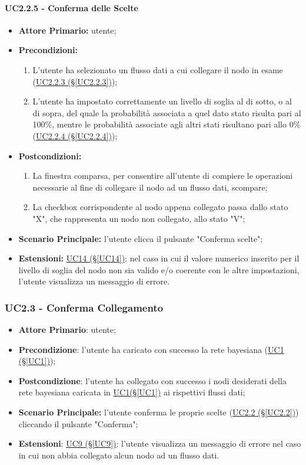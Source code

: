 \paragraph{UC2.2.5 - Conferma delle Scelte}\label{UC2.2.5}
\begin{itemize}
\item \textbf{Attore Primario:} utente;
\item \textbf{Precondizioni:}
	\begin{enumerate}
	\item L'utente ha selezionato un flusso dati a cui collegare il nodo in esame (\hyperref[UC2.2.3]{UC2.2.3 							(§\ref*{UC2.2.3})});
	\item L'utente ha impostato correttamente un livello di soglia al di sotto, o al di sopra, 	del quale la probabilità associata a quel dato stato risulta pari al 100\%, mentre le probabilità associate agli altri stati risultano pari allo 0\% (\hyperref[UC2.2.4]{UC2.2.4 (§\ref*{UC2.2.4})});
	\end{enumerate}
\item \textbf{Postcondizioni:}
	\begin{enumerate}
	\item La finestra comparsa, per consentire all'utente di compiere le operazioni necessarie al fine di collegare il 		nodo ad un flusso dati, scompare;
	\item La checkbox corrispondente al nodo appena collegato passa dallo stato "X", che rappresenta un nodo non 					collegato, allo stato "V";
	\end{enumerate}
\item \textbf{Scenario Principale:} l'utente clicca il pulsante "Conferma scelte";
\item \textbf{Estensioni:} \hyperref[UC14]{UC14 (§\ref*{UC14})}: nel caso in cui il valore numerico inserito per il livello di soglia del nodo non sia valido e/o coerente con le altre impostazioni, l'utente visualizza un messaggio di errore.
\end{itemize}

\pagebreak

\subsubsection{UC2.3 - Conferma Collegamento}\label{UC2.3}
\begin{itemize}
\item \textbf{Attore Primario}: utente;
\item \textbf{Precondizione}: l'utente ha caricato con successo la rete bayesiana (\hyperref[UC1]{UC1 (§\ref*{UC1})});
\item \textbf{Postcondizione}: l'utente ha collegato con successo i nodi desiderati della rete bayesiana caricata 			in \hyperref[UC1]{UC1(§\ref*{UC1})} ai rispettivi flussi dati;
\item \textbf{Scenario Principale:} l'utente conferma le proprie scelte (\hyperref[UC2.2]{UC2.2 (§\ref*{UC2.2})}) cliccando il pulsante "Conferma";
\item \textbf{Estensioni}: \hyperref[UC9]{UC9 (§\ref*{UC9})}: l'utente visualizza un messaggio di errore nel caso in cui non abbia collegato alcun nodo ad un flusso dati.
\end{itemize}
\newpage

